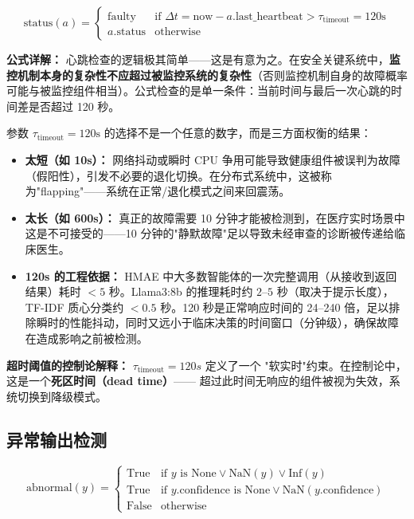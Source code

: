 \documentclass[11pt,a4paper]{ctexart}
\theoremstyle{remark}
\begin{document}
\begin{equation}
\text{status}(a) =
\begin{cases}
\text{faulty} & \text{if } \Delta t = \text{now} - a.\text{last\_heartbeat} > \tau_{\text{timeout}} = 120\text{s} \\
a.\text{status} & \text{otherwise}
\end{cases}
\end{equation}

\textbf{公式详解：} 心跳检查的逻辑极其简单——这是有意为之。在安全关键系统中，\textbf{监控机制本身的复杂性不应超过被监控系统的复杂性}（否则监控机制自身的故障概率可能与被监控组件相当）。公式检查的是单一条件：当前时间与最后一次心跳的时间差是否超过 120 秒。

参数 $\tau_{\text{timeout}} = 120\text{s}$ 的选择不是一个任意的数字，而是三方面权衡的结果：
\begin{itemize}[nosep]
\item \textbf{太短（如 10s）：} 网络抖动或瞬时 CPU 争用可能导致健康组件被误判为故障（假阳性），引发不必要的退化切换。在分布式系统中，这被称为"flapping"——系统在正常/退化模式之间来回震荡。
\item \textbf{太长（如 600s）：} 真正的故障需要 10 分钟才能被检测到，在医疗实时场景中这是不可接受的——10 分钟的"静默故障"足以导致未经审查的诊断被传递给临床医生。
\item \textbf{120s 的工程依据：} HMAE 中大多数智能体的一次完整调用（从接收到返回结果）耗时 $< 5$ 秒。Llama3:8b 的推理耗时约 $2$--$5$ 秒（取决于提示长度），TF-IDF 质心分类约 $< 0.5$ 秒。120 秒是正常响应时间的 24--240 倍，足以排除瞬时的性能抖动，同时又远小于临床决策的时间窗口（分钟级），确保故障在造成影响之前被检测。
\end{itemize}

\textbf{超时阈值的控制论解释：} $\tau_{\text{timeout}} = 120s$ 定义了一个
"软实时"约束。在控制论中，这是一个\textbf{死区时间（dead time）}——
超过此时间无响应的组件被视为失效，系统切换到降级模式。

\subsection{异常输出检测}

\begin{equation}
\text{abnormal}(y) =
\begin{cases}
\text{True} & \text{if } y \text{ is None} \lor \text{NaN}(y) \lor \text{Inf}(y) \\
\text{True} & \text{if } y.\text{confidence} \text{ is None} \lor \text{NaN}(y.\text{confidence}) \\
\text{False} & \text{otherwise}
\end{cases}
\end{equation}
\end{document}
